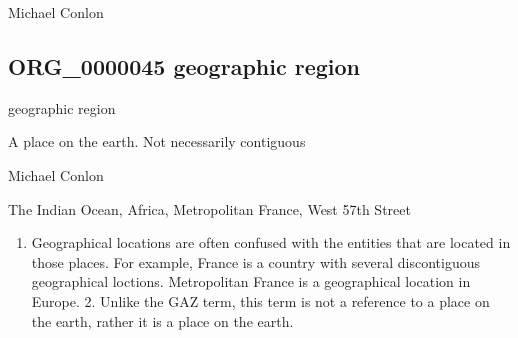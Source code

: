 \documentclass[letterpaper,10pt,english]{sphinxmanual}
\begin{document}
\begin{sphinxShadowBox}

\sphinxAtStartPar
Michael Conlon 
\end{sphinxShadowBox}
\begin{quote}

\ignorespaces \end{quote}


\subsection{ORG\_0000045 \sphinxhyphen{} geographic region}
\label{\detokenize{doc-ORG_0000045:org-0000045-geographic-region}}\label{\detokenize{doc-ORG_0000045:index-0}}\label{\detokenize{doc-ORG_0000045::doc}}
\begin{sphinxShadowBox}

\sphinxAtStartPar
geographic region
\end{sphinxShadowBox}

\begin{sphinxShadowBox}

\sphinxAtStartPar
A place on the earth.  Not necessarily contiguous
\end{sphinxShadowBox}

\begin{sphinxShadowBox}

\sphinxAtStartPar
Michael Conlon 
\end{sphinxShadowBox}

\begin{sphinxShadowBox}

\sphinxAtStartPar
The Indian Ocean, Africa, Metropolitan France, West 57th Street
\end{sphinxShadowBox}

\begin{sphinxShadowBox}
\begin{enumerate}
%
\item {} 
\sphinxAtStartPar
Geographical locations are often confused with the entities that are located in those places.  For example, France is a country with several discontiguous geographical loctions.  Metropolitan France is a geographical location in Europe.  2. Unlike the GAZ term, this term is not a reference to a place on the earth, rather it is a place on the earth.

\end{enumerate}
\end{sphinxShadowBox}
\end{document}
